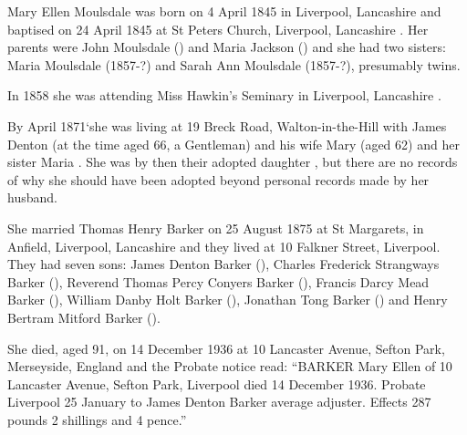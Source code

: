 
Mary Ellen Moulsdale was born on 4 April 1845 in Liverpool, Lancashire \cite{MEMoulsdaleBirth} and baptised on 24 April 1845 at St Peters Church, Liverpool, Lancashire \cite{MEMoulsdaleBaptism}. Her parents were John Moulsdale () and Maria Jackson () and she had two sisters: Maria Moulsdale (1857-?) and Sarah Ann Moulsdale (1857-?), presumably twins. 

In 1858 she was attending Miss Hawkin's Seminary in Liverpool, Lancashire \cite{MEMoulsdaleSchool}. 
  
By April 1871`she was living at 19 Breck Road, Walton-in-the-Hill with James Denton (at the time aged 66, a Gentleman) and his wife Mary (aged 62) and her sister Maria \cite{MEMoulsdaleResidence}.  She was by then their adopted daughter \cite{MEMoulsdaleAdoption},  but there are no records of why she should have been adopted beyond personal records made by her husband. 

She married Thomas Henry Barker on 25 August 1875 at St Margarets, in Anfield, Liverpool, Lancashire \cite{MEMoulsdaleMarriage} and they lived at 10 Falkner Street, Liverpool.  They had seven sons: James Denton Barker (), Charles Frederick Strangways Barker (), Reverend Thomas Percy Conyers Barker (), Francis Darcy Mead Barker (), William Danby Holt Barker (), Jonathan Tong Barker () and Henry Bertram Mitford Barker ().

She died, aged 91, on 14 December 1936 at 10 Lancaster Avenue, Sefton Park, Merseyside, England \cite{ToxtethBarker20} and the Probate notice read:
``BARKER Mary Ellen of 10 Lancaster Avenue, Sefton Park, Liverpool died 14 December 1936. Probate Liverpool 25 January to James Denton Barker average adjuster. Effects 287 pounds 2 shillings and 4 pence.''

